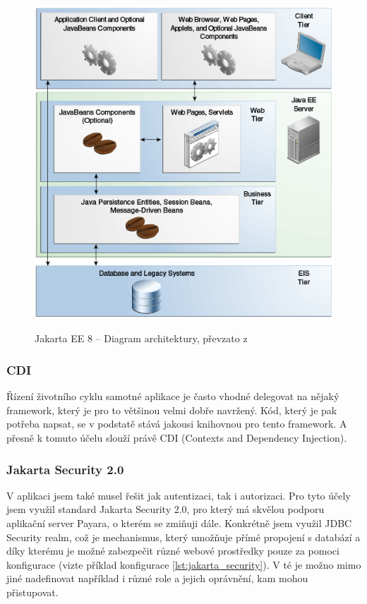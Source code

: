 \documentclass[twoside]{ctuthesis}
\theoremstyle{plain}
\theoremstyle{definition}
\theoremstyle{note}
\begin{document}
\begin{figure}
    \caption{Jakarta EE 8 -- Diagram architektury, převzato z \cite{jakarta:tutorial_diagram}}
    \centering
    \includegraphics[width=\textwidth]{images/jakartaeett_dt_004}
    \label{img:jakartaee}
\end{figure}

\subsubsection{CDI}
Řízení životního cyklu samotné aplikace je často vhodné delegovat na nějaký framework, který je pro to většinou velmi dobře navržený. Kód, který je pak potřeba napsat, se v podstatě stává jakousi knihovnou pro tento framework. A přesně k tomuto účelu slouží právě CDI (Contexts and Dependency Injection).

\subsubsection{Jakarta Security 2.0}
V aplikaci jsem také musel řešit jak autentizaci, tak i autorizaci. Pro tyto účely jsem využil standard Jakarta Security 2.0, pro který má skvělou podporu aplikační server Payara, o kterém se zmiňuji dále. Konkrétně jsem využil JDBC Security realm, což je mechanismus, který umožňuje přímé propojení s databází a díky kterému je možné zabezpečit různé webové prostředky pouze za pomoci konfigurace (vizte příklad konfigurace \ref{lst:jakarta_security}). V té je možno mimo jiné nadefinovat například i různé role a jejich oprávnění, kam mohou přistupovat.
\end{document}
